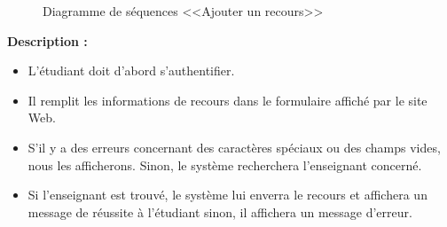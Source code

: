 \documentclass[12pt]{report}
\begin{document}
\begin{figure}[h]
\centering
    \centerline{}
    \caption{Diagramme de séquences <<Ajouter un recours>>}
\end{figure}

\textbf{Description :}

\begin{itemize}
    \item L'étudiant doit d'abord s'authentifier.
    \item Il remplit les informations de recours dans le formulaire affiché par le site Web.
    \item S'il y a des erreurs concernant des caractères spéciaux ou des champs vides, nous les afficherons. Sinon, le système recherchera l'enseignant concerné.
    \item Si l'enseignant est trouvé, le système lui enverra le recours et affichera un message de réussite à l'étudiant sinon, il affichera un message d'erreur.
\end{itemize}
\end{document}
